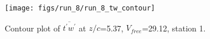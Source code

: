 \begin{figure}[H]
\centering
\texttt{[image: figs/run\_8/run\_8\_tw\_contour]}
\caption{Contour plot of $\overline{t^\prime w^\prime}$ at $z/c$=5.37, $V_{free}$=29.12, station 1.}
\label{fig:run_8_tw_contour}
\end{figure}


